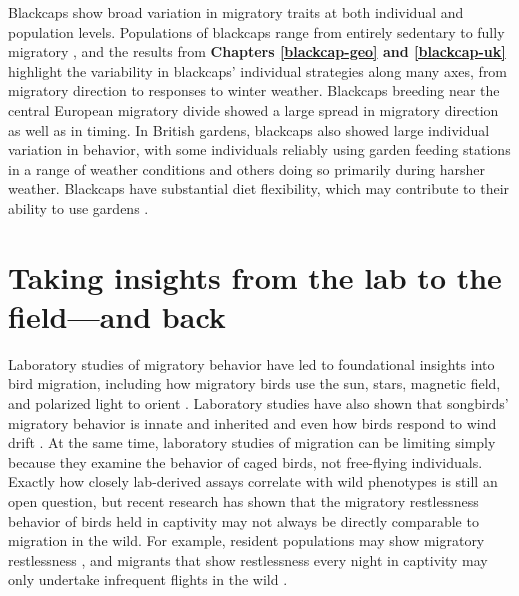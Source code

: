 \documentclass[a4paper, nobind]{templates/ociamthesis}
\begin{document}
Blackcaps show broad variation in migratory traits at both individual and population levels. Populations of blackcaps range from entirely sedentary to fully migratory \autocite{crampSylviaAtricapillaBlackcap1992}, and the results from \textbf{Chapters \ref{blackcap-geo} and \ref{blackcap-uk}} highlight the variability in blackcaps' individual strategies along many axes, from migratory direction to responses to winter weather. Blackcaps breeding near the central European migratory divide showed a large spread in migratory direction as well as in timing. In British gardens, blackcaps also showed large individual variation in behavior, with some individuals reliably using garden feeding stations in a range of weather conditions and others doing so primarily during harsher weather. Blackcaps have substantial diet flexibility, which may contribute to their ability to use gardens \autocite{hardyWinterFoodsBlackcaps1978,reyDietPlasticityBlackcap1999}.

\hypertarget{taking-insights-from-the-lab-to-the-fieldand-back}{%
\section*{Taking insights from the lab to the field---and back}\label{taking-insights-from-the-lab-to-the-fieldand-back}}

Laboratory studies of migratory behavior have led to foundational insights into bird migration, including how migratory birds use the sun, stars, magnetic field, and polarized light to orient \autocite{emlenMigratoryOrientationIndigo1967,wiltschkoEvidenceInnateMagnetic1974,alerstamRoleGeomagneticField1983,akessonHowMigrantsGet2007}. Laboratory studies have also shown that songbirds' migratory behavior is innate and inherited \autocite{bertholdGeneticControlMigratory1991,helbigInheritanceMigratoryDirection1991} and even how birds respond to wind drift \autocite{ableOrientationPasserineNocturnal1977,mooreEvidenceRedeterminationMigratory1990}. At the same time, laboratory studies of migration can be limiting simply because they examine the behavior of caged birds, not free-flying individuals. Exactly how closely lab-derived assays correlate with wild phenotypes is still an open question, but recent research has shown that the migratory restlessness behavior of birds held in captivity may not always be directly comparable to migration in the wild. For example, resident populations may show migratory restlessness \autocite{helmMigratoryRestlessnessEquatorial2006}, and migrants that show restlessness every night in captivity may only undertake infrequent flights in the wild \autocite{zunigaAbruptSwitchMigratory2016,backmanActivityMigratoryFlights2017}.
\end{document}
